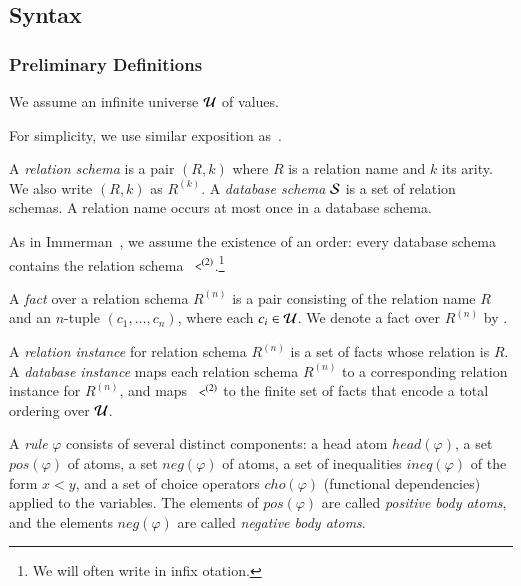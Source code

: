 \subsection{Syntax}

\subsubsection{Preliminary Definitions}


We assume an infinite universe $\univ$ of values.

For simplicity, we use similar exposition as~\cite{ameloot-operational}.

A {\em relation schema} is a pair $(R,k)$ where $R$ is a relation name and $k$ its arity.  We also write $(R,k)$ as $R^{(k)}$.
A {\em database schema} $\schema$ is a set of relation schemas.  A relation name occurs at most once in a database schema.

As in Immerman~\cite{immerman-ptime}, we assume
the existence of an order: every database schema contains the relation schema
$\dedalus{<}^{(2)}$.\footnote{We will often write \dedalus{<} in infix otation.}

A {\em fact} over a relation schema $R^{(n)}$ is a pair consisting of
the relation name $R$ and an $n$-tuple $(c_1,\ldots,c_n)$, where each
$c_i \in \univ$.  We denote a fact over $R^{(n)}$ by .

A {\em relation instance} for relation schema $R^{(n)}$ is a set of facts whose relation is $R$.
A {\em database instance} maps each relation schema $R^{(n)}$ to a corresponding relation instance for
$R^{(n)}$, and maps $\dedalus{<}^{(2)}$ to the finite set of \dedalus{<} facts that encode a total ordering over $\univ$.

A {\em rule} $\varphi$ consists of several distinct components: a head atom $head(\varphi)$, a set $pos(\varphi)$ of atoms, a set $neg(\varphi)$ of atoms, a set of inequalities $ineq(\varphi)$ of the form $x < y$, and a set of choice operators $cho(\varphi)$ (functional dependencies) applied to the variables.  The elements of $pos(\varphi)$ are called {\em positive body atoms}, and the elements $neg(\varphi)$ are called {\em negative body atoms}.

